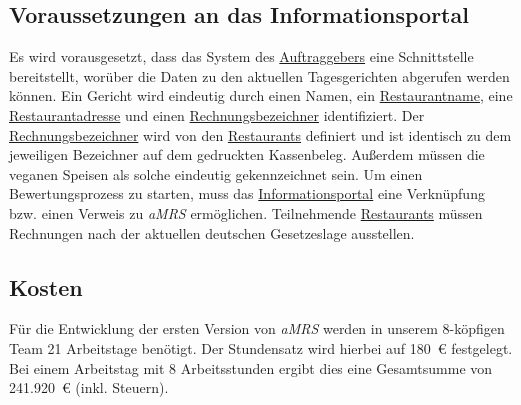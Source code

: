 \subsection{Voraussetzungen an das Informationsportal}
Es wird vorausgesetzt, dass das System des \hyperref[gls:auftraggeber]{Auftraggebers} eine Schnittstelle bereitstellt, worüber die Daten zu den aktuellen Tagesgerichten abgerufen werden können.
Ein Gericht wird eindeutig durch einen Namen, ein \hyperref[gls:restaurantname]{Restaurantname}, eine \hyperref[gls:restaurantadresse]{Restaurantadresse} und einen \hyperref[gls:Rechnungsbezeichner]{Rechnungsbezeichner} identifiziert.
Der \hyperref[gls:Rechnungsbezeichner]{Rechnungsbezeichner} wird von den \hyperref[gls:restaurant]{Restaurants} definiert und ist identisch zu dem jeweiligen Bezeichner auf dem gedruckten Kassenbeleg.
Außerdem müssen die veganen Speisen als solche eindeutig gekennzeichnet sein.
\newparagraph
Um einen Bewertungsprozess zu starten, muss das \hyperref[gls:informationsportal]{Informationsportal} eine Verknüpfung bzw. einen Verweis zu \textit{\ac{aMRS}} ermöglichen.
Teilnehmende \hyperref[gls:restaurant]{Restaurants} müssen Rechnungen nach der aktuellen deutschen Gesetzeslage ausstellen.

\subsection{Kosten}


Für die Entwicklung der ersten Version von \textit{\ac{aMRS}} werden in unserem 8-köpfigen Team 21 Arbeitstage benötigt.
Der Stundensatz wird hierbei auf 180~€ festgelegt.
Bei einem Arbeitstag mit 8 Arbeitsstunden ergibt dies eine Gesamtsumme von 241.920~€ (inkl. Steuern).


